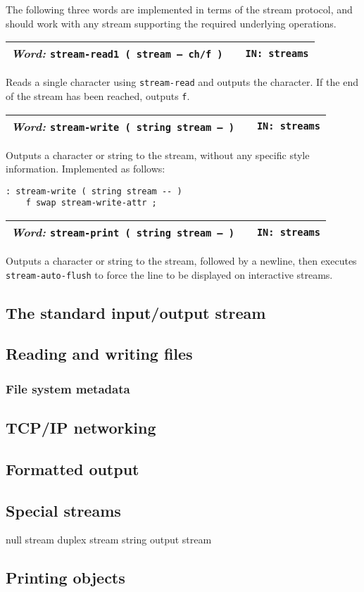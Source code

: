 \documentclass{report}
\newcommand{\ordinaryword}[3]{\index{#1}
\emph{Word:} \texttt{#2} &&\texttt{IN: #3}}
\newcommand{\wordtable}[1]{

\begin{tabularx}{12cm}[t]{lXr}
\hline
#1\\
\hline
\end{tabularx}

}
\begin{document}
The following three words are implemented in terms of the stream protocol, and should work with any stream supporting the required underlying operations.
\wordtable{
\ordinaryword{stream-read1}{stream-read1 ( stream -- ch/f )}{streams}
}
Reads a single character using \texttt{stream-read} and outputs the character. If the end of the stream has been reached, outputs \texttt{f}.
\wordtable{
\ordinaryword{stream-write}{stream-write ( string stream -- )}{streams}
}
Outputs a character or string to the stream, without any specific style information. Implemented as follows:
\begin{verbatim}
: stream-write ( string stream -- )
    f swap stream-write-attr ;
\end{verbatim}
\wordtable{
\ordinaryword{stream-print}{stream-print ( string stream -- )}{streams}
}
Outputs a character or string to the stream, followed by a newline, then executes \texttt{stream-auto-flush} to force the line to be displayed on interactive streams.

\subsection{\label{stdio}The standard input/output stream}

\subsection{Reading and writing files}

\subsubsection{File system metadata}

\subsection{TCP/IP networking}

\subsection{\label{style}Formatted output}

\subsection{Special streams}

null stream
duplex stream
string output stream

\subsection{Printing objects}
\end{document}
